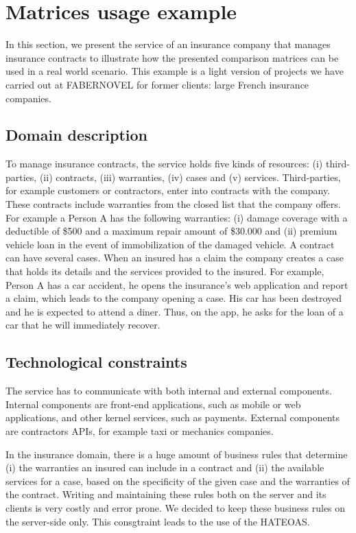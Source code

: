 \section{Matrices usage example}

In this section, we present the service of an insurance company that manages insurance contracts to illustrate how the presented comparison matrices can be used in a real world scenario. This example is a light version of projects we have carried out at FABERNOVEL for former clients: large French insurance companies.

\subsection{Domain description}

To manage insurance contracts, the service holds five kinds of resources: (i) third-parties, (ii) contracts, (iii) warranties, (iv) cases and (v) services. Third-parties, for example customers or contractors, enter into contracts with the company. These contracts include warranties from the closed list that the company offers. For example a Person A has the following warranties: (i) damage coverage with a deductible of \$500 and a maximum repair amount of \$30.000 and (ii) premium vehicle loan in the event of immobilization of the damaged vehicle. A contract can have several cases. When an insured has a claim the company creates a case that holds its details and the services provided to the insured. For example, Person A has a car accident, he opens the insurance's web application and report a claim, which leads to the company opening a case. His car has been destroyed and he is expected to attend a diner. Thus, on the app, he asks for the loan of a car that he will immediately recover.

\subsection{Technological constraints}

The service has to communicate with both internal and external components. Internal components are front-end applications, such as mobile or web applications, and other kernel services, such as payments. External components are contractors APIs, for example taxi or mechanics companies.

In the insurance domain, there is a huge amount of business rules that determine (i) the warranties an insured can include in a contract and (ii) the available services for a case, based on the specificity of the given case and the warranties of the contract. Writing and maintaining these rules both on the server and its clients is very costly and error prone. We decided to keep these business rules on the server-side only. This consgtraint leads to the use of the HATEOAS.

